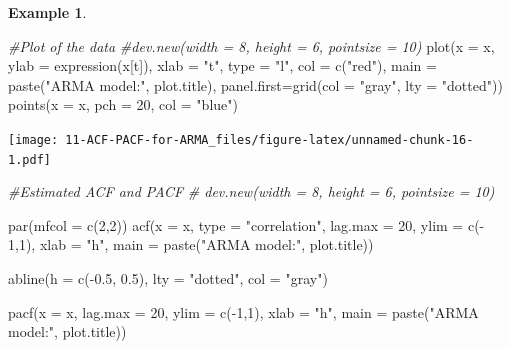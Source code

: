 \documentclass[
]{book}
\newenvironment{Shaded}{\begin{snugshade}}{\end{snugshade}}
\newcommand{\AttributeTok}[1]{\textcolor[rgb]{0.77,0.63,0.00}{#1}}
\newcommand{\CommentTok}[1]{\textcolor[rgb]{0.56,0.35,0.01}{\textit{#1}}}
\newcommand{\DecValTok}[1]{\textcolor[rgb]{0.00,0.00,0.81}{#1}}
\newcommand{\FloatTok}[1]{\textcolor[rgb]{0.00,0.00,0.81}{#1}}
\newcommand{\FunctionTok}[1]{\textcolor[rgb]{0.00,0.00,0.00}{#1}}
\newcommand{\NormalTok}[1]{#1}
\newcommand{\SpecialCharTok}[1]{\textcolor[rgb]{0.00,0.00,0.00}{#1}}
\newcommand{\StringTok}[1]{\textcolor[rgb]{0.31,0.60,0.02}{#1}}
\theoremstyle{definition}
\theoremstyle{definition}
\newtheorem{example}{Example}[chapter]
\theoremstyle{definition}
\theoremstyle{definition}
\theoremstyle{remark}
\begin{document}
\begin{example}
\begin{Shaded}
\begin{Highlighting}[]
\CommentTok{\#Plot of the data}
  \CommentTok{\#dev.new(width = 8, height = 6, pointsize = 10)  }
  \FunctionTok{plot}\NormalTok{(}\AttributeTok{x =}\NormalTok{ x, }\AttributeTok{ylab =} \FunctionTok{expression}\NormalTok{(x[t]), }\AttributeTok{xlab =} \StringTok{"t"}\NormalTok{, }\AttributeTok{type =} 
       \StringTok{"l"}\NormalTok{, }\AttributeTok{col =} \FunctionTok{c}\NormalTok{(}\StringTok{"red"}\NormalTok{), }\AttributeTok{main =}  \FunctionTok{paste}\NormalTok{(}\StringTok{"ARMA model:"}\NormalTok{, }
\NormalTok{       plot.title), }\AttributeTok{panel.first=}\FunctionTok{grid}\NormalTok{(}\AttributeTok{col =} \StringTok{"gray"}\NormalTok{, }\AttributeTok{lty =} 
       \StringTok{"dotted"}\NormalTok{))}
  \FunctionTok{points}\NormalTok{(}\AttributeTok{x =}\NormalTok{ x, }\AttributeTok{pch =} \DecValTok{20}\NormalTok{, }\AttributeTok{col =} \StringTok{"blue"}\NormalTok{)}
\end{Highlighting}
\end{Shaded}

\texttt{[image: 11-ACF-PACF-for-ARMA\_files/figure-latex/unnamed-chunk-16-1.pdf]}

\begin{Shaded}
\begin{Highlighting}[]
\CommentTok{\#Estimated ACF and PACF}
\CommentTok{\# dev.new(width = 8, height = 6, pointsize = 10)  }

\FunctionTok{par}\NormalTok{(}\AttributeTok{mfcol =} \FunctionTok{c}\NormalTok{(}\DecValTok{2}\NormalTok{,}\DecValTok{2}\NormalTok{))}
\FunctionTok{acf}\NormalTok{(}\AttributeTok{x =}\NormalTok{ x, }\AttributeTok{type =} \StringTok{"correlation"}\NormalTok{, }\AttributeTok{lag.max =} \DecValTok{20}\NormalTok{, }\AttributeTok{ylim =} \FunctionTok{c}\NormalTok{(}\SpecialCharTok{{-}}
      \DecValTok{1}\NormalTok{,}\DecValTok{1}\NormalTok{), }\AttributeTok{xlab =} \StringTok{"h"}\NormalTok{, }\AttributeTok{main =} \FunctionTok{paste}\NormalTok{(}\StringTok{"ARMA model:"}\NormalTok{, }
\NormalTok{      plot.title))}
  
\FunctionTok{abline}\NormalTok{(}\AttributeTok{h =} \FunctionTok{c}\NormalTok{(}\SpecialCharTok{{-}}\FloatTok{0.5}\NormalTok{, }\FloatTok{0.5}\NormalTok{), }\AttributeTok{lty =} \StringTok{"dotted"}\NormalTok{, }\AttributeTok{col =} \StringTok{"gray"}\NormalTok{)}
  
\FunctionTok{pacf}\NormalTok{(}\AttributeTok{x =}\NormalTok{ x, }\AttributeTok{lag.max =} \DecValTok{20}\NormalTok{, }\AttributeTok{ylim =} \FunctionTok{c}\NormalTok{(}\SpecialCharTok{{-}}\DecValTok{1}\NormalTok{,}\DecValTok{1}\NormalTok{), }\AttributeTok{xlab =} \StringTok{"h"}\NormalTok{,}
       \AttributeTok{main =} \FunctionTok{paste}\NormalTok{(}\StringTok{"ARMA model:"}\NormalTok{, plot.title))}
  

\end{Highlighting}
\end{Shaded}
\end{example}
\end{document}
